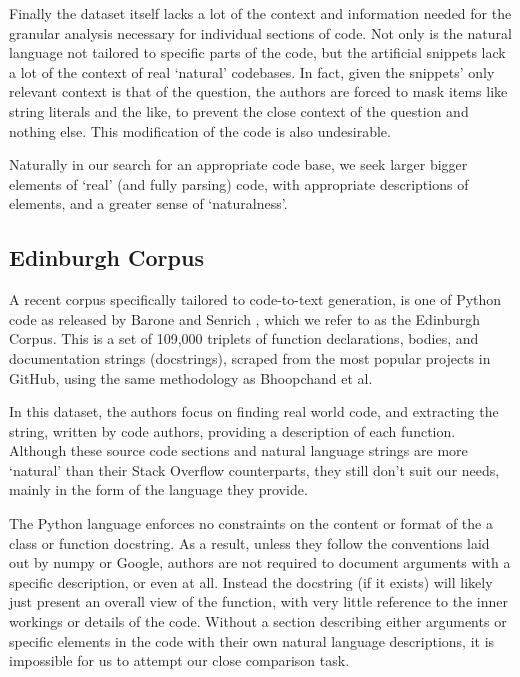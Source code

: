 Finally the dataset itself lacks a lot of the context and information needed for the granular analysis necessary for individual sections of code. Not only is the natural language not tailored to specific parts of the code, but the artificial snippets lack a lot of the context of real `natural' codebases. In fact, given the snippets' only relevant context is that of the question, the authors are forced to mask items like string literals and the like, to prevent the close context of the question and nothing else. This modification of the code is also undesirable.

Naturally in our search for an appropriate code base, we seek larger bigger elements of `real' (and fully parsing) code, with appropriate descriptions of elements, and a greater sense of `naturalness'.

\subsection{Edinburgh Corpus}

A recent corpus specifically tailored to code-to-text generation, is one of Python code as released by Barone and Senrich \cite{barone_parallel_2017}, which we refer to as the Edinburgh Corpus. 
This is a set of 109,000 triplets of function declarations, bodies, and documentation strings (docstrings), scraped from the most popular projects in GitHub, using the same methodology as Bhoopchand et al. 

In this dataset, the authors focus on finding real world code, and extracting the string, written by code authors, providing a description of each function.
Although these source code sections and natural language strings are more `natural' than their Stack Overflow counterparts, they still don't suit our needs, mainly in the form of the language they provide. 

The Python language enforces no constraints on the content or format of the a class or function docstring.
As a result, unless they follow the conventions laid out by numpy or Google, authors are not required to document arguments with a specific description, or even at all.
Instead the docstring (if it exists) will likely just present an overall view of the function, with very little reference to the inner workings or details of the code. 
Without a section describing either arguments or specific elements in the code with their own natural language descriptions, it is impossible for us to attempt our close comparison task.


